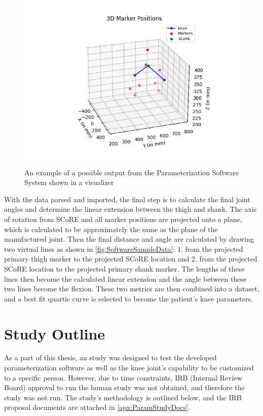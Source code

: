 \begin{figure}[ht!]
    \centering
    \includegraphics[width=\textwidth]{Figures/Param/3D_Marker_Animation.png}
    \caption{An example of a possible output from the Parameterization Software System shown in a visualizer}
    \label{fig:SoftwareSampleData}
\end{figure}

With the data parsed and imported, the final step is to calculate the final joint angles and determine the linear extension between the thigh and shank. The axis of rotation from SCoRE and all marker positions are projected onto a plane, which is calculated to be approximately the same as the plane of the manufactured joint. Then the final distance and angle are calculated by drawing two virtual lines as shown in \autoref{fig:SoftwareSampleData}: 1. from the projected primary thigh marker to the projected SCoRE location and 2. from the projected SCoRE location to the projected primary shank marker. The lengths of these lines then become the calculated linear extension and the angle between these two lines become the flexion. These two metrics are then combined into a dataset, and a best fit quartic curve is selected to become the patient's knee parameters.

\section{Study Outline}

As a part of this thesis, an study was designed to test the developed parameterization software as well as the knee joint's capability to be customized to a specific person. However, due to time constraints, IRB (Internal Review Board) approval to run the human study was not obtained, and therefore the study was not run. The study's methodology is outlined below, and the IRB proposal documents are attached in \autoref{apx:ParamStudyDocs}.

